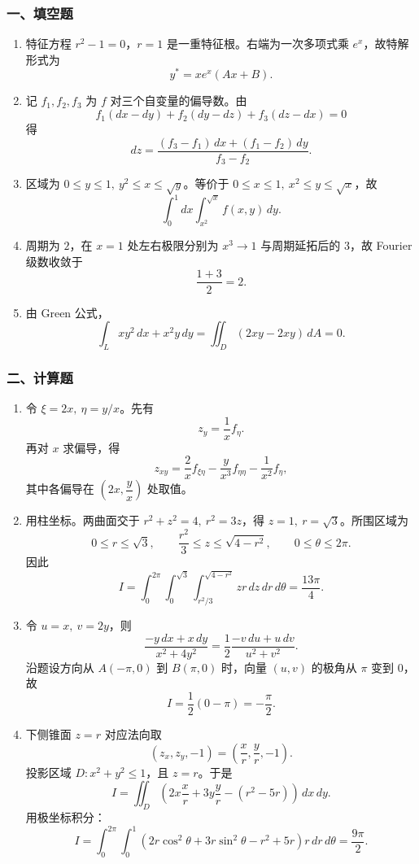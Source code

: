 \subsubsection*{一、填空题}
\begin{enumerate}
  \item 特征方程 $r^2-1=0$，$r=1$ 是一重特征根。右端为一次多项式乘 $e^x$，故特解形式为
  \[
  y^*=xe^x(Ax+B).
  \]
  \item 记 $f_1,f_2,f_3$ 为 $f$ 对三个自变量的偏导数。由
  \[
  f_1(dx-dy)+f_2(dy-dz)+f_3(dz-dx)=0
  \]
  得
  \[
  dz=\frac{(f_3-f_1)\,dx+(f_1-f_2)\,dy}{f_3-f_2}.
  \]
  \item 区域为 $0\le y\le1,\ y^2\le x\le\sqrt y$。等价于 $0\le x\le1,\ x^2\le y\le\sqrt x$，故
  \[
  \int_0^1dx\int_{x^2}^{\sqrt x}f(x,y)\,dy.
  \]
  \item 周期为 $2$，在 $x=1$ 处左右极限分别为 $x^3\to1$ 与周期延拓后的 $3$，故 Fourier 级数收敛于
  \[
  \frac{1+3}{2}=2.
  \]
  \item 由 Green 公式，
  \[
  \int_Lxy^2\,dx+x^2y\,dy=\iint_D(2xy-2xy)\,dA=0.
  \]
\end{enumerate}

\subsubsection*{二、计算题}
\begin{enumerate}
  \item 令 $\xi=2x,\ \eta=y/x$。先有
  \[
  z_y=\frac1x f_\eta.
  \]
  再对 $x$ 求偏导，得
  \[
  z_{xy}=\frac2x f_{\xi\eta}-\frac{y}{x^3}f_{\eta\eta}-\frac1{x^2}f_\eta,
  \]
  其中各偏导在 $\left(2x,\dfrac{y}{x}\right)$ 处取值。
  \item 用柱坐标。两曲面交于 $r^2+z^2=4,\ r^2=3z$，得 $z=1,\ r=\sqrt3$。所围区域为
  \[
  0\le r\le\sqrt3,\qquad \frac{r^2}{3}\le z\le\sqrt{4-r^2},\qquad 0\le\theta\le2\pi .
  \]
  因此
  \[
  I=\int_0^{2\pi}\int_0^{\sqrt3}\int_{r^2/3}^{\sqrt{4-r^2}}z r\,dz\,dr\,d\theta
  =\frac{13\pi}{4}.
  \]
  \item 令 $u=x,\ v=2y$，则
  \[
  \frac{-y\,dx+x\,dy}{x^2+4y^2}
  =\frac12\frac{-v\,du+u\,dv}{u^2+v^2}.
  \]
  沿题设方向从 $A(-\pi,0)$ 到 $B(\pi,0)$ 时，向量 $(u,v)$ 的极角从 $\pi$ 变到 $0$，故
  \[
  I=\frac12(0-\pi)=-\frac{\pi}{2}.
  \]
  \item 下侧锥面 $z=r$ 对应法向取
  \[
  (z_x,z_y,-1)=\left(\frac{x}{r},\frac{y}{r},-1\right).
  \]
  投影区域 $D:x^2+y^2\le1$，且 $z=r$。于是
  \[
  I=\iint_D\left(2x\frac{x}{r}+3y\frac{y}{r}-(r^2-5r)\right)\,dx\,dy.
  \]
  用极坐标积分：
  \[
  I=\int_0^{2\pi}\int_0^1\left(2r\cos^2\theta+3r\sin^2\theta-r^2+5r\right)r\,dr\,d\theta
  =\frac{9\pi}{2}.
  \]
\end{enumerate}

